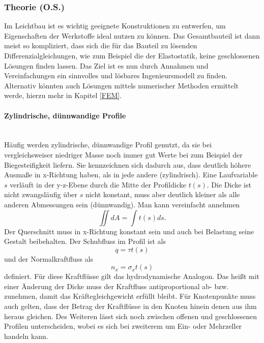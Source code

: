 
\subsubsection{Theorie (O.S.)}
Im Leichtbau ist es wichtig geeignete Konstruktionen zu entwerfen, um Eigenschaften der Werkstoffe ideal nutzen zu können. Das Gesamtbauteil ist dann meist so kompliziert, dass sich die für das Bauteil zu lösenden Differenzialgleichungen, wie zum Beispiel die der Elastostatik, keine geschlossenen Lösungen finden lassen. Das Ziel ist es nun durch Annahmen und Vereinfachungen ein sinnvolles und lösbares Ingenieursmodell zu finden. Alternativ könnten auch Lösungen mittels numerischer Methoden ermittelt werde, hierzu mehr in Kapitel \ref{FEM}.

\paragraph{Zylindrische, dünnwandige Profile}~\\
Häufig werden zylindrische, dünnwandige Profil genutzt, da sie bei vergleichsweiser niedriger Masse noch immer gut Werte bei zum Beispiel der Biegesteifigkeit liefern. Sie kennzeichnen sich dadurch aus, dass deutlich höhere Ausmaße in x-Richtung haben, als in jede andere (zylindrisch). Eine Laufvariable $s$ verläuft in der y-z-Ebene durch die Mitte der Profildicke $t(s)$. Die Dicke ist nicht zwangsläufig über $s$ nicht konstant, muss aber deutlich kleiner als alle anderen Abmessungen sein (dünnwandig). Man kann vereinfacht annehmen
\begin{equation}
	\iint dA=\int t(s)ds.
\end{equation} 
Der Querschnitt muss in x-Richtung konstant sein und auch bei Belastung seine Gestalt beibehalten. Der Schubfluss im Profil ist als
\begin{equation}\label{tau}
	q=\tau t(s)
\end{equation}
und der Normalkraftfluss als
\begin{equation}
	n_x=\sigma_x t(s)
\end{equation}
definiert. Für diese Kraftflüsse gilt das hydrodynamische Analogon. Das heißt mit einer Änderung der Dicke muss der Kraftfluss antiproportional ab- bzw. zunehmen, damit das Kräftegleichgewicht erfüllt bleibt. Für Knotenpunkte muss auch gelten, dass der Betrag der Kraftflüsse in den Knoten hinein denen aus ihm heraus gleichen. Des Weiteren lässt sich noch zwischen offenen und geschlossenen Profilen unterscheiden, wobei es sich bei zweiterem um Ein- oder Mehrzeller handeln kann.\cite{item15}

